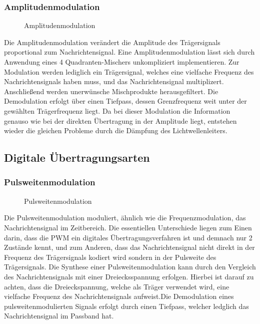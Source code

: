 \subsubsection{Amplitudenmodulation}
\begin{figure}[H]
\centering
  \scalebox{0.7}{\begin{large}$$\end{large}}
  \caption{Amplitudenmodulation}
  \label{fig:am}
\end{figure}
Die Amplitudenmodulation verändert die Amplitude des Trägersignals proportional zum Nachrichtensignal.
Eine Amplitudenmodulation lässt sich durch Anwendung eines 4 Quadranten-Mischers unkompliziert implementieren. Zur Modulation werden lediglich ein Trägersignal, welches eine vielfache Frequenz des Nachrichtensignals haben muss, und das Nachrichtensignal multiplizert. Anschließend werden unerwünsche Mischprodukte herausgefiltert. Die Demodulation erfolgt über einen Tiefpass, dessen Grenzfrequenz weit unter der gewählten Trägerfrequenz liegt.
Da bei dieser Modulation die Information genauso wie bei der direkten Übertragung in der Amplitude liegt, entstehen wieder die gleichen Probleme durch die Dämpfung des Lichtwellenleiters.

\subsection{Digitale Übertragungsarten}
\subsubsection{Pulsweitenmodulation}
\begin{figure}[H]
\centering
  \scalebox{0.7}{\begin{large}
  $$
  \end{large}}
  \caption{Pulsweitenmodulation}
  \label{fig:pwm}
\end{figure}
Die Pulsweitenmodulation moduliert, ähnlich wie die Frequenzmodulation, das Nachrichtensignal im Zeitbereich. 
Die essentiellen Unterschiede liegen zum Einen darin, dass die PWM ein digitales Übertragungsverfahren ist und demnach nur 2 Zustände kennt, und zum Anderen, dass das Nachrichtensignal nicht direkt in der Frequenz des Trägersignals kodiert wird sondern in der Pulsweite des Trägersignals. Die Synthese einer Pulsweitenmodulation kann durch den Vergleich des Nachrichtensignals mit einer Dreiecksspannung erfolgen. Hierbei ist darauf zu achten, dass die Dreieckspannung, welche als Träger verwendet wird, eine vielfache Frequenz des Nachrichtensignals aufweist.Die Demodulation eines pulsweitenmodulierten Signals erfolgt durch einen Tiefpass, welcher ledglich das Nachrichtensignal im Passband hat. 




